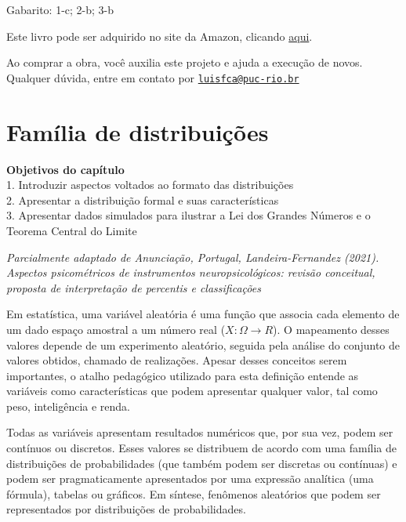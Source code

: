 \documentclass[
]{book}
\newenvironment{objectives}{
  \definecolor{shadecolor}{rgb}{0, 0, 0}  %
  \color{white}
  \begin{shaded}}
 {\end{shaded}}
\begin{document}
Gabarito: 1-c; 2-b; 3-b

Este livro pode ser adquirido no site da Amazon, clicando \href{https://www.amazon.com.br/gp/product/B097CP7T9M?pf_rd_r=RDZC8XYMBC1WY69T0J8K\&pf_rd_p=abb22e6b-8812-4b76-a424-5f0b098d2c90\&pd_rd_r=ceec1911-f409-4acd-ac8f-2d5bc68dac43\&pd_rd_w=wMUzJ\&pd_rd_wg=ZK85a\&ref_=pd_gw_unk}{aqui}.

Ao comprar a obra, você auxilia este projeto e ajuda a execução de novos. Qualquer dúvida, entre em contato por \href{mailto:luisfca@puc-rio.br}{\nolinkurl{luisfca@puc-rio.br}}

\hypertarget{famuxedlia-de-distribuiuxe7uxf5es}{%
\chapter{Família de distribuições}\label{famuxedlia-de-distribuiuxe7uxf5es}}

\begin{objectives}
\textbf{Objetivos do capítulo}\\
1. Introduzir aspectos voltados ao formato das distribuições\\
2. Apresentar a distribuição formal e suas características\\
3. Apresentar dados simulados para ilustrar a Lei dos Grandes Números e o Teorema Central do Limite

\end{objectives}

\emph{Parcialmente adaptado de Anunciação, Portugal, Landeira-Fernandez (2021). Aspectos psicométricos de instrumentos neuropsicológicos: revisão conceitual, proposta de interpretação de percentis e classificações }

Em estatística, uma variável aleatória é uma função que associa cada elemento de um dado espaço amostral a um número real (\(X:\Omega \rightarrow R\)). O mapeamento desses valores depende de um experimento aleatório, seguida pela análise do conjunto de valores obtidos, chamado de realizações. Apesar desses conceitos serem importantes, o atalho pedagógico utilizado para esta definição entende as variáveis como características que podem apresentar qualquer valor, tal como peso, inteligência e renda.

Todas as variáveis apresentam resultados numéricos que, por sua vez, podem ser contínuos ou discretos. Esses valores se distribuem de acordo com uma família de distribuições de probabilidades (que também podem ser discretas ou contínuas) e podem ser pragmaticamente apresentados por uma expressão analítica (uma fórmula), tabelas ou gráficos. Em síntese, fenômenos aleatórios que podem ser representados por distribuições de probabilidades.
\end{document}
